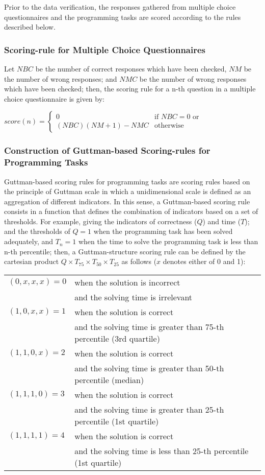 Prior to the data verification, the responses gathered from multiple choice questionnaires and the programming tasks are scored according to the rules described below.

\subsubsection*{Scoring-rule for Multiple Choice Questionnaires}

Let $NBC$ be the number of correct responses which have been checked, $NM$ be the number of wrong responses; and $NMC$ be the number of wrong responses which have been checked; then, the scoring rule for a n-th question in a multiple choice questionnaire is given by:

$ score(n) = \begin{cases}
0 & \text{if } NBC = 0 \text{ or }  \\
(NBC)(NM+1) - NMC & \text{otherwise}
\end{cases}$

\subsubsection*{Construction of Guttman-based Scoring-rules for Programming Tasks}

Guttman-based scoring rules for programming tasks \cite{Guttman2017} are scoring rules based on the principle of Guttman scale in which a unidimensional scale is defined as an aggregation of different indicators. In this sense, a Guttman-based scoring rule consists in a function that defines the combination of indicators based on a set of thresholds. For example, giving the indicators of correctness ($Q$) and time ($T$); and the thresholds of $Q = 1$ when the programming task has been solved adequately, and $T_{n} = 1$ when the time to solve the programming task is less than n-th percentile; then, a Guttman-structure scoring rule can be defined by the cartesian product $Q{\times}T_{75}{\times}T_{50}{\times}T_{25}$ as follows ($x$ denotes either of 0 and 1):

\begin{center}\scriptsize
\begin{tabular}{ll}
$(0,x,x,x) = 0$ & when the solution is incorrect\\
 & and the solving time is irrelevant\\
$(1,0,x,x) = 1$ & when the solution is correct\\
& and the solving time is greater than 75-th percentile (3rd quartile)\\
$(1,1,0,x) = 2$ & when the solution is correct\\
& and the solving time is greater than 50-th percentile (median)\\
$(1,1,1,0) = 3$ & when the solution is correct\\
 & and the solving time is greater than 25-th percentile (1st quartile)\\
$(1,1,1,1) = 4$ & when the solution is correct\\
 & and the solving time is less than 25-th percentile (1st quartile)\\
\end{tabular}
\end{center}

